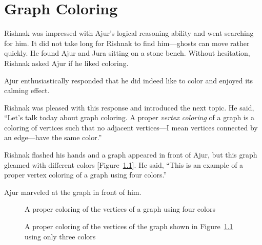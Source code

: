 \chapter{Graph Coloring}
Rishnak was impressed with Ajur's logical reasoning ability and went searching for him. It did not take long for Rishnak to find him---ghosts can move rather quickly. He found Ajur and Jura sitting on a stone bench. Without hesitation, Rishnak asked Ajur if he liked coloring.

Ajur enthusiastically responded that he did indeed like to color and enjoyed its calming effect.

Rishnak was pleased with this response and introduced the next topic. He said, ``Let's talk today about graph coloring. A proper \textit{vertex coloring} of a graph is a coloring of vertices such that no adjacent vertices---I mean vertices connected by an edge---have the same color.''

Rishnak flashed his hands and a graph appeared in front of Ajur, but this graph gleamed with different colors [Figure~\ref{10g1}]. He said, ``This is an example of a proper vertex coloring of a graph using four colors.''

Ajur marveled at the graph in front of him.

\begin{figure}[ht]
\begin{center}
\caption{A proper coloring of the vertices of a graph using four colors}\label{10g1}
\end{center}
\end{figure}

\begin{figure}[ht]
\begin{center}
\caption{A proper coloring of the vertices of the graph shown in Figure~\ref{10g1} using only three colors}\label{10g2}
\end{center}
\end{figure}

